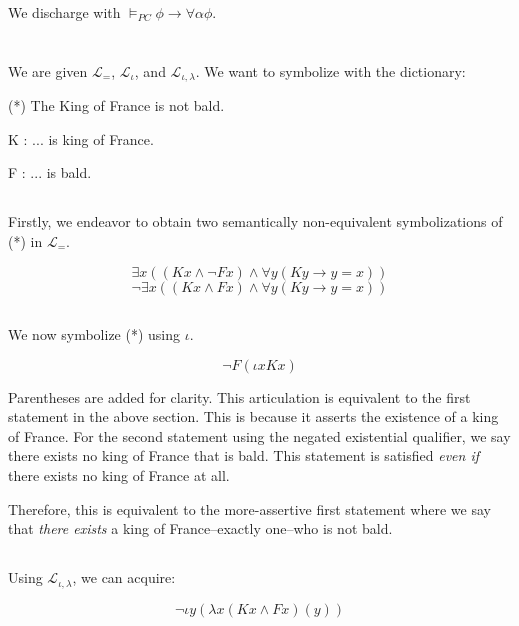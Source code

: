 \documentclass{article}
\begin{document}
    We discharge with $\vDash_{PC} \phi \rightarrow \forall \alpha \phi$.
    
    \section{}
    We are given $\mathscr{L}_=$, $\mathscr{L}_\iota$, and $\mathscr{L}_{\iota, \lambda}$.
    We want to symbolize with the dictionary: \newline
        
    (*) The King of France is not bald. 
    
    K : ... is king of France. 

    F : ... is bald.

    \subsection{}
    Firstly, we endeavor to obtain two semantically non-equivalent symbolizations of (*) in $\mathscr{L}_=$.
    
    $$\exists x ((Kx \wedge \lnot Fx) \wedge \forall y(Ky \rightarrow y = x))$$
    $$\lnot \exists x ((Kx \wedge Fx) \wedge \forall y(Ky \rightarrow y = x))$$

    \subsection{}
    We now symbolize (*) using $\iota$.

    $$\lnot F(\iota x Kx)$$
    
    Parentheses are added for clarity. This articulation is equivalent to the first statement in the above section.
    This is because it asserts the existence of a king of France. For the second statement using the negated existential qualifier, we say there exists no king of France that is bald.
    This statement is satisfied \textit{even if} there exists no king of France at all.

    Therefore, this is equivalent to the more-assertive first statement where we say that \textit{there exists} a king of France--exactly one--who is not bald.

    \subsection{}
    Using $\mathscr{L}_{\iota , \lambda}$, we can acquire:

    $$ \lnot \iota y(\lambda x (Kx \wedge Fx) (y))$$
\end{document}
